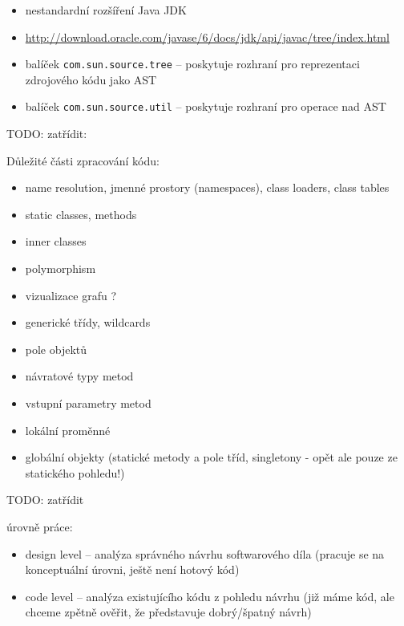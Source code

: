 \begin{itemize}
\begin{itemize}
    \begin{itemize}
    \item nestandardní rozšíření Java JDK
    \item \href{http://download.oracle.com/javase/6/docs/jdk/api/javac/tree/index.html}{http://download.oracle.com/javase/6/docs/jdk/api/javac/tree/index.html}
    \item balíček \verb+com.sun.source.tree+ -- poskytuje rozhraní pro reprezentaci zdrojového kódu jako AST
    \item balíček \verb+com.sun.source.util+ -- poskytuje rozhraní pro operace nad AST
    \end{itemize}
  \end{itemize}
\end{itemize}

TODO: zatřídit:

Důležité části zpracování kódu:

\begin{itemize}
\item name resolution, jmenné prostory (namespaces), class loaders, class tables
\item static classes, methods
\item inner classes
\item polymorphism
\item vizualizace grafu ?
\item generické třídy, wildcards
\item pole objektů
\item návratové typy metod
\item vstupní parametry metod
\item lokální proměnné
\item globální objekty (statické metody a pole tříd, singletony - opět ale pouze ze statického pohledu!)
\end{itemize}

TODO: zatřídit

úrovně práce:

\begin{itemize}
\item design level -- analýza správného návrhu softwarového díla (pracuje se na konceptuální úrovni, ještě není hotový kód)
\item code level -- analýza existujícího kódu z pohledu návrhu (již máme kód, ale chceme zpětně ověřit, že představuje dobrý/špatný návrh)
\end{itemize}
